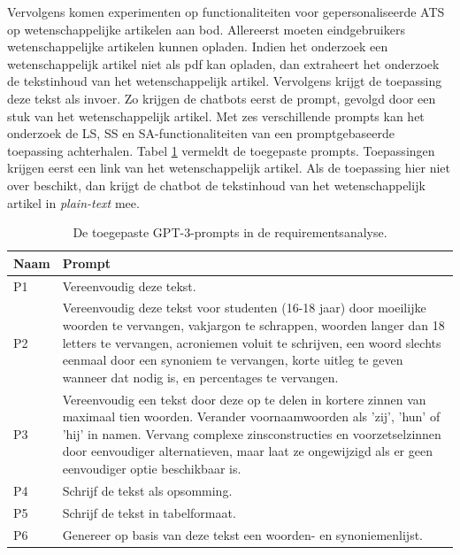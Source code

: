 \medspace

Vervolgens komen experimenten op functionaliteiten voor gepersonaliseerde ATS op wetenschappelijke artikelen aan bod. Allereerst moeten eindgebruikers wetenschappelijke artikelen kunnen opladen. Indien het onderzoek een wetenschappelijk artikel niet als pdf kan opladen, dan extraheert het onderzoek de tekstinhoud van het wetenschappelijk artikel. Vervolgens krijgt de toepassing deze tekst als invoer. Zo krijgen de chatbots eerst de prompt, gevolgd door een stuk van het wetenschappelijk artikel. Met zes verschillende prompts kan het onderzoek de LS, SS en SA-functionaliteiten van een promptgebaseerde toepassing achterhalen. Tabel \ref{table:tested-prompts-requirementsanalysis} vermeldt de toegepaste prompts. Toepassingen krijgen eerst een link van het wetenschappelijk artikel. Als de toepassing hier niet over beschikt, dan krijgt de chatbot de tekstinhoud van het wetenschappelijk artikel in \textit{plain-text} mee. 

\begin{center}
	\begin{table}[H]
		\begin{tabular}{ | m{2cm} | m{14cm} | } 
			\hline
			\textbf{Naam} & \textbf{Prompt} \\
			\hline
			P1 & Vereenvoudig deze tekst. \\
			\hline
			P2 & Vereenvoudig deze tekst voor studenten (16-18 jaar) door moeilijke woorden te vervangen, vakjargon te schrappen, woorden langer dan 18 letters te vervangen, acroniemen voluit te schrijven, een woord slechts eenmaal door een synoniem te vervangen, korte uitleg te geven wanneer dat nodig is, en percentages te vervangen. \\
			\hline
			P3 & Vereenvoudig een tekst door deze op te delen in kortere zinnen van maximaal tien woorden. Verander voornaamwoorden als 'zij', 'hun' of 'hij' in namen. Vervang complexe zinsconstructies en voorzetselzinnen door eenvoudiger alternatieven, maar laat ze ongewijzigd als er geen eenvoudiger optie beschikbaar is. \\
			\hline
			P4 & Schrijf de tekst als opsomming. \\
			\hline
			P5 & Schrijf de tekst in tabelformaat. \\
			\hline
			P6 & Genereer op basis van deze tekst een woorden- en synoniemenlijst. \\
			\hline
		\end{tabular}
		\caption{De toegepaste GPT-3-prompts in de requirementsanalyse.}
		\label{table:tested-prompts-requirementsanalysis}
	\end{table}
\end{center}

